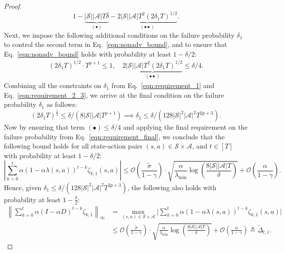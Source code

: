 \documentclass{article}
\newcommand{\mc}{\mathcal}
\begin{document}
\begin{proof}
\begin{equation}
    1 - \underbrace{|\mathcal{S}| |\mathcal{A}| T \bar{\delta}}_{(\bullet)} - \underbrace{2 |\mathcal{S}| |\mathcal{A}| T^2 (2 \delta_1 T)^{1/2}}_{(\bullet\bullet)}. 
\end{equation}
Next, we impose the following additional conditions on the failure probability \(\delta_1\) to control the second term in Eq.~\eqref{eqn:nonadv_bound}, and to ensure that Eq.~\eqref{eqn:nonadv_bound} holds with probability at least \(1 - \delta/2\):
\begin{align}\label{eqn:requirement_2_3}
(2 \delta_1 T)^{1/2} \cdot T^{p+1} \leq 1, \quad \underbrace{2 |\mathcal{S}| |\mathcal{A}| T^2 (2 \delta_1 T)^{1/2}}_{(\bullet\bullet)} \leq \delta / 4.
\end{align}
Combining all the constraints on \(\delta_1\) from Eq.~\eqref{eqn:requirement_1} and Eq.~\eqref{eqn:requirement_2_3}, we arrive at the final condition on the failure probability \(\delta_1\) as follows:
\begin{equation}\label{eqn:requirement_final}
    (2 \delta_1 T)^{\frac{1}{2}} \le \delta/(8|\mathcal{S}| |\mathcal{A}| T^{p+1}) \implies \delta_1 \le \delta/(128|\mathcal{S}|^2 |\mathcal{A}|^2 T^{2p+3}).
\end{equation}
Now by ensuring that term \((\bullet) \leq \delta/4\) and applying the final requirement on the failure probability from Eq.~\eqref{eqn:requirement_final}, we conclude that the following bound holds for all state-action pairs \((s,a) \in \mc{S} \times \mc{A}\), and \(t \in [T]\) with probability at least \(1 - \delta/2\):
\begin{equation}
    \left| \sum_{k=0}^{t} \alpha (1 - \alpha \lambda(s,a))^{t - k} \zeta_{k,1}(s,a) \right|
    \leq 
    \mathcal{O}\left( \frac{ \tilde{\sigma} }{1 - \gamma} \right) 
    \cdot \sqrt{ \frac{ \alpha }{ \lambda_{\min} } \log \left( \frac{8|\mc{S}||\mc{A}|T}{\delta} \right)} 
    + \mathcal{O} \left( \frac{\alpha}{1 - \gamma} \right).
\end{equation}
Hence, given \(\delta_1 \le \delta/(128|\mathcal{S}|^2 |\mathcal{A}|^2 T^{2p+3})\), the following also holds with probability at least \(1-\frac{\delta}{2}\):
\begin{equation}\label{eqn:delta_1_raq}
\begin{aligned}
     \left \lVert \sum_{k=0}^{t} \alpha (I-\alpha D)^{t-k} \mathcal{\zeta}_{k,1}\right \rVert_\infty &= \max_{(s,a) \in \mathcal{S}\times\mathcal{A}}\bigg\lvert \sum_{k=0}^{t} \alpha (1-\alpha \lambda(s,a))^{t-k} \zeta_{k,1}(s,a) \bigg\rvert\\ &\le \mathcal{O}\left( \frac{ \tilde{\sigma} }{1 - \gamma} \right) 
    \cdot \sqrt{ \frac{ \alpha }{ \lambda_{\min} } \log \left( \frac{8|\mc{S}||\mc{A}|T}{\delta} \right)} 
    + \mathcal{O} \left( \frac{\alpha}{1 - \gamma} \right) \triangleq \tilde{\Delta}_{t,1}.
\end{aligned}
\end{equation}
\end{proof}
\end{document}
